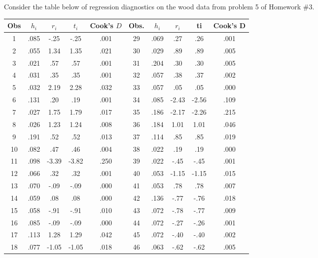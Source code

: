 \documentclass{homework}
\begin{document}
\begin{longproblem}
  Consider the table below of regression diagnostics on the wood data from problem 5 of Homework \#3.  
\begin{center}
\begin{tabular}{c c c c c | c c c c c}
  Obs & $h_i$& $r_i$&$t_i$  & Cook’s $D$ & Obs.& $h_i$ &$r_i$  & ti   & Cook’s D\\
\hline
  1   & .085 & -.25 & -.25  & .001       & 29  & .069  & .27   & .26  & .001    \\
  2   & .055 & 1.34 & 1.35  & .021       & 30  & .029  & .89   & .89  & .005    \\
  3   & .021 & .57  & .57   & .001       & 31  & .204  & .30   & .30  & .005    \\
  4   & .031 & .35  & .35   & .001       & 32  & .057  & .38   & .37  & .002    \\
  5   & .032 & 2.19 & 2.28  & .032       & 33  & .057  & .05   & .05  & .000    \\
  6   & .131 & .20  & .19   & .001       & 34  & .085  & -2.43 & -2.56& .109    \\
  7   & .027 & 1.75 & 1.79  & .017       & 35  & .186  & -2.17 & -2.26& .215    \\
  8   & .026 & 1.23 & 1.24  & .008       & 36  & .184  & 1.01  & 1.01 & .046    \\
  9   & .191 & .52  & .52   & .013       & 37  & .114  & .85   & .85  & .019    \\
  10  & .082 & .47  & .46   & .004       & 38  & .022  & .19   & .19  & .000    \\
  11  & .098 & -3.39& -3.82 & .250       & 39  & .022  & -.45  & -.45 & .001    \\
  12  & .066 & .32  & .32   & .001       & 40  & .053  & -1.15 & -1.15& .015    \\
  13  & .070 & -.09 & -.09  & .000       & 41  & .053  & .78   & .78  & .007    \\
  14  & .059 & .08  & .08   & .000       & 42  & .136  & -.77  & -.76 & .018    \\
  15  & .058 & -.91 & -.91  & .010       & 43  & .072  & -.78  & -.77 & .009    \\
  16  & .085 & -.09 & -.09  & .000       & 44  & .072  & -.27  & -.26 & .001    \\
  17  & .113 & 1.28 & 1.29  & .042       & 45  & .072  & -.40  & -.40 & .002    \\
  18  & .077 & -1.05& -1.05 & .018       & 46  & .063  & -.62  & -.62 & .005    \\

\end{tabular}
\end{center}
\end{longproblem}
\end{document}
